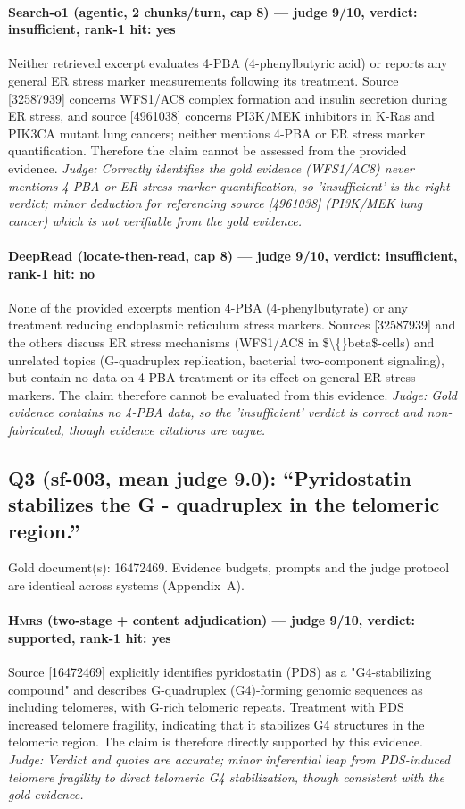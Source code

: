 \documentclass[sigconf, review, anonymous]{acmart}
\begin{document}
\paragraph{Search-o1 (agentic, 2 chunks/turn, cap 8) --- judge 9/10, verdict: insufficient, rank-1 hit: yes}
\noindent Neither retrieved excerpt evaluates 4-PBA (4-phenylbutyric acid) or reports any general ER stress marker measurements following its treatment. Source [32587939] concerns WFS1/AC8 complex formation and insulin secretion during ER stress, and source [4961038] concerns PI3K/MEK inhibitors in K-Ras and PIK3CA mutant lung cancers; neither mentions 4-PBA or ER stress marker quantification. Therefore the claim cannot be assessed from the provided evidence.
\noindent\small\textit{Judge: Correctly identifies the gold evidence (WFS1/AC8) never mentions 4-PBA or ER-stress-marker quantification, so 'insufficient' is the right verdict; minor deduction for referencing source [4961038] (PI3K/MEK lung cancer) which is not verifiable from the gold evidence.}
\paragraph{DeepRead (locate-then-read, cap 8) --- judge 9/10, verdict: insufficient, rank-1 hit: no}
\noindent None of the provided excerpts mention 4-PBA (4-phenylbutyrate) or any treatment reducing endoplasmic reticulum stress markers. Sources [32587939] and the others discuss ER stress mechanisms (WFS1/AC8 in \$\textbackslash\{\}beta\$-cells) and unrelated topics (G-quadruplex replication, bacterial two-component signaling), but contain no data on 4-PBA treatment or its effect on general ER stress markers. The claim therefore cannot be evaluated from this evidence.
\noindent\small\textit{Judge: Gold evidence contains no 4-PBA data, so the 'insufficient' verdict is correct and non-fabricated, though evidence citations are vague.}

\subsection{Q3 (sf-003, mean judge 9.0): ``Pyridostatin stabilizes the G - quadruplex in the telomeric region.''}
\label{app:q3}
\noindent Gold document(s): 16472469. Evidence budgets, prompts and the judge protocol are identical across systems (Appendix~A).
\paragraph{\textbf{\textsc{Hmrs}} (two-stage + content adjudication) --- judge 9/10, verdict: supported, rank-1 hit: yes}
\noindent Source [16472469] explicitly identifies pyridostatin (PDS) as a "G4-stabilizing compound" and describes G-quadruplex (G4)-forming genomic sequences as including telomeres, with G-rich telomeric repeats. Treatment with PDS increased telomere fragility, indicating that it stabilizes G4 structures in the telomeric region. The claim is therefore directly supported by this evidence.
\noindent\small\textit{Judge: Verdict and quotes are accurate; minor inferential leap from PDS-induced telomere fragility to direct telomeric G4 stabilization, though consistent with the gold evidence.}
\end{document}
